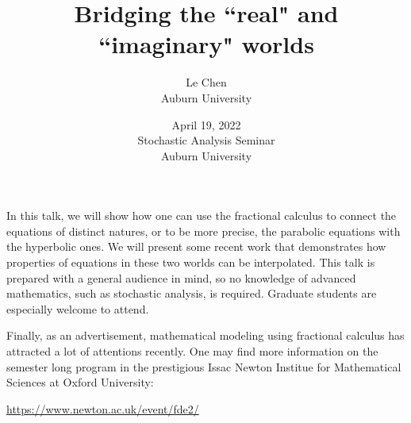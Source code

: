 \documentclass[12pt]{article}
\title{Bridging the ``real" and ``imaginary" worlds}
\author{
  Le Chen \\
  Auburn University \\[1em]
  }
\date{April 19, 2022 \\[1em]
  Stochastic Analysis Seminar \\[1em]
  Auburn University
  }
\theoremstyle{plain} \newtheorem{theorem}{Theorem}[section]
\theoremstyle{definition} \newtheorem{definition}[theorem]{Definition}
\begin{document}
 \maketitle \noindent


 In this talk, we will show how one can use the fractional calculus to connect the equations of distinct natures, or to be more precise, the parabolic equations with the hyperbolic ones. We will present some recent work that demonstrates how properties of equations in these two worlds can be interpolated. This talk is prepared with a general audience in mind, so no knowledge of advanced mathematics, such as stochastic analysis, is required. Graduate students are especially welcome to attend.

Finally, as an advertisement, mathematical modeling using fractional calculus has attracted a lot of attentions recently. One may find more information on the semester long program in the prestigious Issac Newton Institue for Mathematical Sciences at Oxford University:

\begin{center}
  \url{https://www.newton.ac.uk/event/fde2/}
\end{center}


%
%
%
\end{document}
